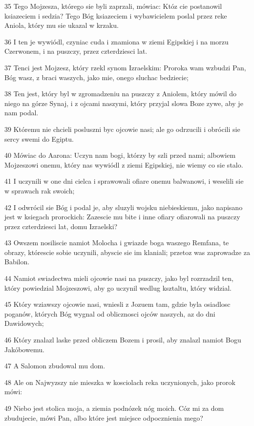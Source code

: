 \par 35 Tego Mojzesza, którego sie byli zaprzali, mówiac: Któz cie postanowil ksiazeciem i sedzia? Tego Bóg ksiazeciem i wybawicielem poslal przez reke Aniola, który mu sie ukazal w krzaku.
\par 36 I ten je wywiódl, czyniac cuda i znamiona w ziemi Egipskiej i na morzu Czerwonem, i na puszczy, przez czterdziesci lat.
\par 37 Tenci jest Mojzesz, który rzekl synom Izraelskim: Proroka wam wzbudzi Pan, Bóg wasz, z braci waszych, jako mie, onego sluchac bedziecie;
\par 38 Ten jest, który byl w zgromadzeniu na puszczy z Aniolem, który mówil do niego na górze Synaj, i z ojcami naszymi, który przyjal slowa Boze zywe, aby je nam podal.
\par 39 Któremu nie chcieli posluszni byc ojcowie nasi; ale go odrzucili i obrócili sie sercy swemi do Egiptu.
\par 40 Mówiac do Aarona: Uczyn nam bogi, którzy by szli przed nami; albowiem Mojzeszowi onemu, który nas wywiódl z ziemi Egipskiej, nie wiemy co sie stalo.
\par 41 I uczynili w one dni cielca i sprawowali ofiare onemu balwanowi, i weselili sie w sprawach rak swoich;
\par 42 I odwrócil sie Bóg i podal je, aby sluzyli wojsku niebieskiemu, jako napisano jest w ksiegach prorockich: Zazescie mu bite i inne ofiary ofiarowali na puszczy przez czterdziesci lat, domu Izraelski?
\par 43 Owszem nosiliscie namiot Molocha i gwiazde boga waszego Remfana, te obrazy, którescie sobie uczynili, abyscie sie im klaniali; przetoz was zaprowadze za Babilon.
\par 44 Namiot swiadectwa mieli ojcowie nasi na puszczy, jako byl rozrzadzil ten, który powiedzial Mojzeszowi, aby go uczynil wedlug ksztaltu, który widzial.
\par 45 Który wziawszy ojcowie nasi, wniesli z Jozuem tam, gdzie byla osiadlosc poganów, których Bóg wygnal od oblicznosci ojców naszych, az do dni Dawidowych;
\par 46 Który znalazl laske przed obliczem Bozem i prosil, aby znalazl namiot Bogu Jakóbowemu.
\par 47 A Salomon zbudowal mu dom.
\par 48 Ale on Najwyzszy nie mieszka w kosciolach reka uczynionych, jako prorok mówi:
\par 49 Niebo jest stolica moja, a ziemia podnózek nóg moich. Cóz mi za dom zbudujecie, mówi Pan, albo które jest miejsce odpocznienia mego?
